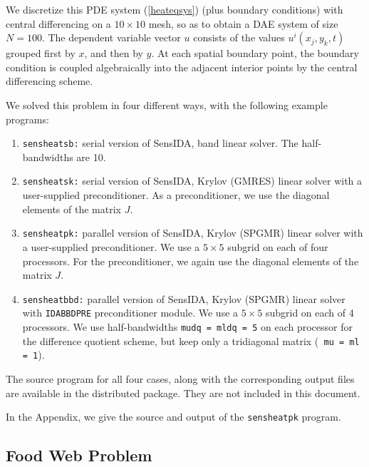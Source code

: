 We discretize this PDE system (\ref{heateqsys}) (plus boundary conditions)
with central differencing on a $10 \times 10$ mesh, so as to obtain a
DAE system of size $N = 100$.  The dependent variable vector $u$
consists of the values $u^i(x_j,y_k,t)$ grouped first by $x$, and then
 by $y$.  At each spatial boundary point, the boundary condition is coupled
algebraically into the adjacent interior points by the central differencing
scheme. 

We solved this problem in four different ways, with the following
example programs:
\begin{enumerate}
\item {\tt sensheatsb:} serial version of SensIDA, band linear solver.
The half-bandwidths are 10. 
\item {\tt sensheatsk:} serial version of SensIDA, Krylov (GMRES)
linear solver with a user-supplied preconditioner.
As a preconditioner, we use the diagonal elements of the matrix $J$.
\item {\tt sensheatpk:} parallel version of SensIDA, Krylov (SPGMR)
linear solver with a user-supplied preconditioner.
We use a $5 \times 5$ subgrid on each of four processors.
For the preconditioner, we again use the diagonal elements of the
matrix $J$.
\item {\tt sensheatbbd:} parallel version of SensIDA, Krylov (SPGMR)
linear solver with {\tt IDABBDPRE} preconditioner module.
We use a $5 \times 5$ subgrid on each of 4 processors.
We use half-bandwidths {\tt mudq = mldq = 5} on each processor for the
difference quotient scheme, but keep only a tridiagonal matrix ({\tt
mu = ml = 1}).
\end{enumerate}

The source program for all four cases, along with the corresponding
output files are available in the distributed package.
They are not included in this document.

In the Appendix, we give the source and output of the {\tt sensheatpk}
program.

\subsection{Food Web Problem}

